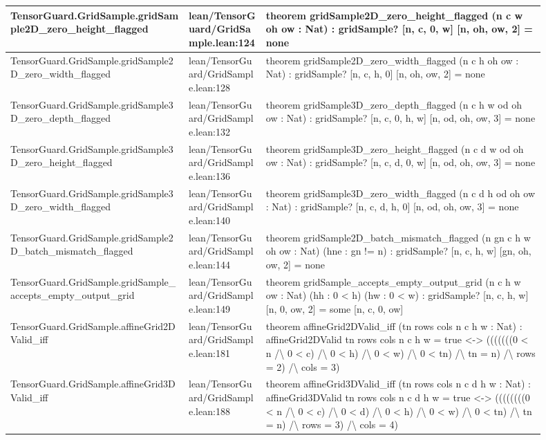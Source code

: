 \documentclass[10pt]{article}
\begin{document}
\begin{longtable}{|p{0.30\linewidth}|p{0.13\linewidth}|p{0.47\linewidth}|}
\hline
TensorGuard.GridSample.gridSample2D\_zero\_height\_flagged & lean/TensorGuard/GridSample.lean:124 & theorem gridSample2D\_zero\_height\_flagged (n c w oh ow : Nat) : gridSample? [n, c, 0, w] [n, oh, ow, 2] = none \\
\hline
TensorGuard.GridSample.gridSample2D\_zero\_width\_flagged & lean/TensorGuard/GridSample.lean:128 & theorem gridSample2D\_zero\_width\_flagged (n c h oh ow : Nat) : gridSample? [n, c, h, 0] [n, oh, ow, 2] = none \\
\hline
TensorGuard.GridSample.gridSample3D\_zero\_depth\_flagged & lean/TensorGuard/GridSample.lean:132 & theorem gridSample3D\_zero\_depth\_flagged (n c h w od oh ow : Nat) : gridSample? [n, c, 0, h, w] [n, od, oh, ow, 3] = none \\
\hline
TensorGuard.GridSample.gridSample3D\_zero\_height\_flagged & lean/TensorGuard/GridSample.lean:136 & theorem gridSample3D\_zero\_height\_flagged (n c d w od oh ow : Nat) : gridSample? [n, c, d, 0, w] [n, od, oh, ow, 3] = none \\
\hline
TensorGuard.GridSample.gridSample3D\_zero\_width\_flagged & lean/TensorGuard/GridSample.lean:140 & theorem gridSample3D\_zero\_width\_flagged (n c d h od oh ow : Nat) : gridSample? [n, c, d, h, 0] [n, od, oh, ow, 3] = none \\
\hline
TensorGuard.GridSample.gridSample2D\_batch\_mismatch\_flagged & lean/TensorGuard/GridSample.lean:144 & theorem gridSample2D\_batch\_mismatch\_flagged (n gn c h w oh ow : Nat) (hne : gn != n) : gridSample? [n, c, h, w] [gn, oh, ow, 2] = none \\
\hline
TensorGuard.GridSample.gridSample\_accepts\_empty\_output\_grid & lean/TensorGuard/GridSample.lean:149 & theorem gridSample\_accepts\_empty\_output\_grid (n c h w ow : Nat) (hh : 0 < h) (hw : 0 < w) : gridSample? [n, c, h, w] [n, 0, ow, 2] = some [n, c, 0, ow] \\
\hline
TensorGuard.GridSample.affineGrid2DValid\_iff & lean/TensorGuard/GridSample.lean:181 & theorem affineGrid2DValid\_iff (tn rows cols n c h w : Nat) : affineGrid2DValid tn rows cols n c h w = true <-> (((((((0 < n /\textbackslash{} 0 < c) /\textbackslash{} 0 < h) /\textbackslash{} 0 < w) /\textbackslash{} 0 < tn) /\textbackslash{} tn = n) /\textbackslash{} rows = 2) /\textbackslash{} cols = 3) \\
\hline
TensorGuard.GridSample.affineGrid3DValid\_iff & lean/TensorGuard/GridSample.lean:188 & theorem affineGrid3DValid\_iff (tn rows cols n c d h w : Nat) : affineGrid3DValid tn rows cols n c d h w = true <-> ((((((((0 < n /\textbackslash{} 0 < c) /\textbackslash{} 0 < d) /\textbackslash{} 0 < h) /\textbackslash{} 0 < w) /\textbackslash{} 0 < tn) /\textbackslash{} tn = n) /\textbackslash{} rows = 3) /\textbackslash{} cols = 4) \\

\end{longtable}
\end{document}
